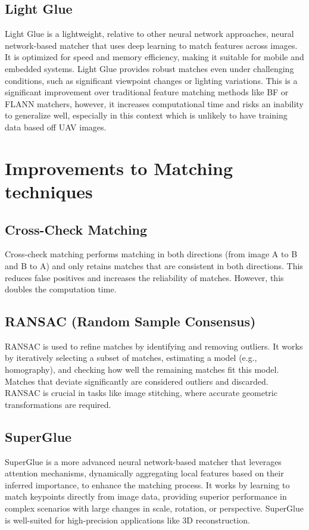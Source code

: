 \subsection*{Light Glue} Light Glue is a lightweight, relative to other neural network approaches, neural network-based matcher that uses deep learning to match features across images. It is optimized for speed and memory efficiency, making it suitable for mobile and embedded systems. Light Glue provides robust matches even under challenging conditions, such as significant viewpoint changes or lighting variations. This is a significant improvement over traditional feature matching methods like BF or FLANN matchers, however, it increases computational time and risks an inability to generalize well, especially in this context which is unlikely to have training data based off UAV images.

\section*{Improvements to Matching techniques}
\subsection*{Cross-Check Matching} Cross-check matching performs matching in both directions (from image A to B and B to A) and only retains matches that are consistent in both directions. This reduces false positives and increases the reliability of matches. However, this doubles the computation time.
 

\subsection*{RANSAC (Random Sample Consensus)} RANSAC is used to refine matches by identifying and removing outliers. It works by iteratively selecting a subset of matches, estimating a model (e.g., homography), and checking how well the remaining matches fit this model. Matches that deviate significantly are considered outliers and discarded. RANSAC is crucial in tasks like image stitching, where accurate geometric transformations are required.


\subsection*{SuperGlue} SuperGlue is a more advanced neural network-based matcher that leverages attention mechanisms, dynamically aggregating local features based on their inferred importance, to enhance the matching process. It works by learning to match keypoints directly from image data, providing superior performance in complex scenarios with large changes in scale, rotation, or perspective. SuperGlue is well-suited for high-precision applications like 3D reconstruction. 


